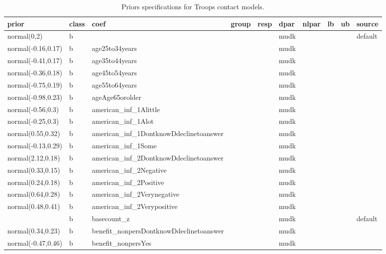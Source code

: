 \documentclass[
]{book}
\theoremstyle{definition}
\theoremstyle{definition}
\theoremstyle{definition}
\theoremstyle{definition}
\theoremstyle{remark}
\begin{document}
\begin{table}

\caption{\label{tab:prior-info-crime-troops}Priors specifications for Troops contact models.}
\centering
\fontsize{11}{13}\selectfont
\begin{tabular}[t]{l|l|l|l|l|l|l|l|l|l}
\hline
prior & class & coef & group & resp & dpar & nlpar & lb & ub & source\\
\hline
normal(0,2) & b &  &  &  & mudk &  &  &  & default\\
\hline
normal(-0.16,0.17) & b & age25to34years &  &  & mudk &  &  &  & \\
\hline
normal(-0.41,0.17) & b & age35to44years &  &  & mudk &  &  &  & \\
\hline
normal(-0.36,0.18) & b & age45to54years &  &  & mudk &  &  &  & \\
\hline
normal(-0.75,0.19) & b & age55to64years &  &  & mudk &  &  &  & \\
\hline
normal(-0.98,0.23) & b & ageAge65orolder &  &  & mudk &  &  &  & \\
\hline
normal(-0.56,0.3) & b & american\_inf\_1Alittle &  &  & mudk &  &  &  & \\
\hline
normal(-0.25,0.3) & b & american\_inf\_1Alot &  &  & mudk &  &  &  & \\
\hline
normal(0.55,0.32) & b & american\_inf\_1DontknowDdeclinetoanswer &  &  & mudk &  &  &  & \\
\hline
normal(-0.13,0.29) & b & american\_inf\_1Some &  &  & mudk &  &  &  & \\
\hline
normal(2.12,0.18) & b & american\_inf\_2DontknowDdeclinetoanswer &  &  & mudk &  &  &  & \\
\hline
normal(0.33,0.15) & b & american\_inf\_2Negative &  &  & mudk &  &  &  & \\
\hline
normal(0.24,0.18) & b & american\_inf\_2Positive &  &  & mudk &  &  &  & \\
\hline
normal(0.64,0.28) & b & american\_inf\_2Verynegative &  &  & mudk &  &  &  & \\
\hline
normal(0.48,0.41) & b & american\_inf\_2Verypositive &  &  & mudk &  &  &  & \\
\hline
 & b & basecount\_z &  &  & mudk &  &  &  & default\\
\hline
normal(0.34,0.23) & b & benefit\_nonpersDontknowDdeclinetoanswer &  &  & mudk &  &  &  & \\
\hline
normal(-0.47,0.46) & b & benefit\_nonpersYes &  &  & mudk &  &  &  & \\
\hline

\end{tabular}
\end{table}
\end{document}
